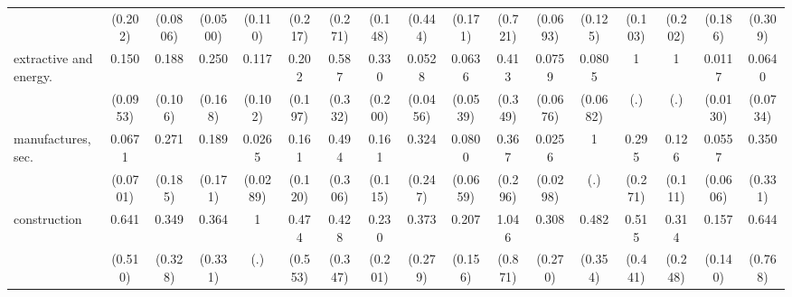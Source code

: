 {\begin{tabular}{l*{16}{c}}
                    &     (0.202)         &    (0.0806)         &    (0.0500)         &     (0.110)         &     (0.217)         &     (0.271)         &     (0.148)         &     (0.444)         &     (0.171)         &     (0.721)         &    (0.0693)         &     (0.125)         &     (0.103)         &     (0.202)         &     (0.186)         &     (0.309)         \\
[1em]
extractive and energy.&       0.150\sym{**} &       0.188\sym{**} &       0.250\sym{*}  &       0.117\sym{*}  &       0.202         &       0.587         &       0.330         &      0.0528\sym{***}&      0.0636\sym{**} &       0.413         &      0.0759\sym{**} &      0.0805\sym{**} &           1         &           1         &      0.0117\sym{***}&      0.0640\sym{*}  \\
                    &    (0.0953)         &     (0.106)         &     (0.168)         &     (0.102)         &     (0.197)         &     (0.332)         &     (0.200)         &    (0.0456)         &    (0.0539)         &     (0.349)         &    (0.0676)         &    (0.0682)         &         (.)         &         (.)         &    (0.0130)         &    (0.0734)         \\
[1em]
manufactures, sec.  &      0.0671\sym{**} &       0.271         &       0.189         &      0.0265\sym{***}&       0.161\sym{*}  &       0.494         &       0.161\sym{*}  &       0.324         &      0.0800\sym{**} &       0.367         &      0.0256\sym{**} &           1         &       0.295         &       0.126\sym{*}  &      0.0557\sym{**} &       0.350         \\
                    &    (0.0701)         &     (0.185)         &     (0.171)         &    (0.0289)         &     (0.120)         &     (0.306)         &     (0.115)         &     (0.247)         &    (0.0659)         &     (0.296)         &    (0.0298)         &         (.)         &     (0.271)         &     (0.111)         &    (0.0606)         &     (0.331)         \\
[1em]
construction        &       0.641         &       0.349         &       0.364         &           1         &       0.474         &       0.428         &       0.230         &       0.373         &       0.207\sym{*}  &       1.046         &       0.308         &       0.482         &       0.515         &       0.314         &       0.157\sym{*}  &       0.644         \\
                    &     (0.510)         &     (0.328)         &     (0.331)         &         (.)         &     (0.553)         &     (0.347)         &     (0.201)         &     (0.279)         &     (0.156)         &     (0.871)         &     (0.270)         &     (0.354)         &     (0.441)         &     (0.248)         &     (0.140)         &     (0.768)         \\

\end{tabular}}
